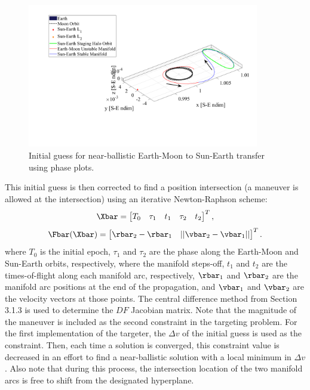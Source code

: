 \begin{figure}[ht]
    \centering
    \includegraphics[width=0.9\textwidth]{figures/InitialGuess.pdf}
    \caption{Initial guess for near-ballistic Earth-Moon to Sun-Earth transfer using phase plots.}
    \label{fig:initialGuess}
\end{figure}

This initial guess is then corrected to find a position intersection (a maneuver is allowed at the
intersection) using an iterative Newton-Raphson scheme:
\begin{equation}
    \Xbar=\begin{bmatrix}   T_{0}   &   \tau_{1}    &   t_{1}   &   \tau_{2}    &   t_{2}   \end{bmatrix}^{T},
    \label{eq:nbfreevar}
\end{equation}
\begin{equation}
    \Fbar(\Xbar)=\begin{bmatrix}    \rbar_{2}-\rbar_{1} &   ||\vbar_{2}-\vbar_{1}|| \end{bmatrix}^{T}.
    \label{eq:nbconst}
\end{equation}
where $T_{0}$ is the initial epoch, $\tau_{1}$ and $\tau_{2}$ are the phase along the Earth-Moon
and Sun-Earth orbits, respectively, where the manifold steps-off, $t_{1}$ and $t_{2}$ are the
times-of-flight along each manifold arc, respectively, $\rbar_{1}$ and $\rbar_{2}$ are the manifold
arc positions at the end of the propagation, and $\vbar_{1}$ and $\vbar_{2}$ are the velocity
vectors at those points. The central difference method from Section 3.1.3 is used to determine the
$DF$ Jacobian matrix. Note that the magnitude of the maneuver is included as the second constraint
in the targeting problem. For the first implementation of the targeter, the $\Delta v$ of the
initial guess is used as the constraint. Then, each time a solution is converged, this constraint
value is decreased in an effort to find a near-ballistic solution with a local minimum in
$\Delta v$. Also note that during this process, the intersection location of the two manifold arcs
is free to shift from the designated hyperplane.

